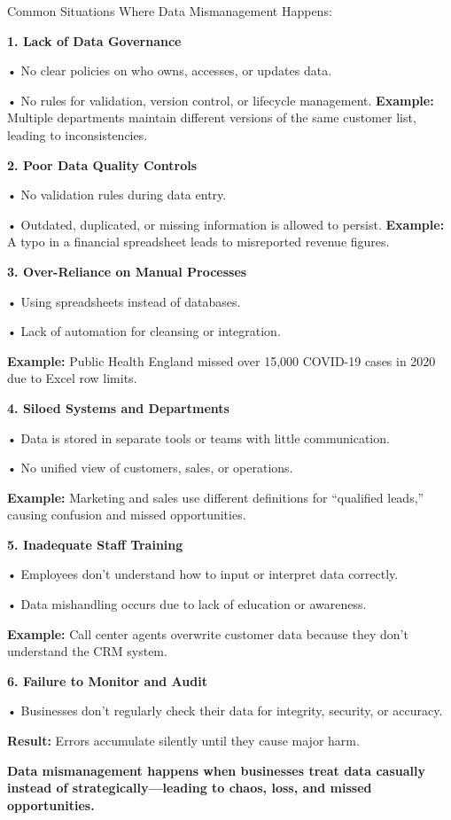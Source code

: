 \documentclass[
  man,
  floatsintext,
  longtable,
  nolmodern,
  notxfonts,
  notimes,
  colorlinks=true,linkcolor=blue,citecolor=blue,urlcolor=blue]{apa7}
\begin{document}
Common Situations Where Data Mismanagement Happens:

\textbf{1. Lack of Data Governance}

• No clear policies on who owns, accesses, or updates data.

• No rules for validation, version control, or lifecycle management.
\textbf{Example:} Multiple departments maintain different versions of
the same customer list, leading to inconsistencies.

\textbf{2. Poor Data Quality Controls}

• No validation rules during data entry.

• Outdated, duplicated, or missing information is allowed to persist.
\textbf{Example:} A typo in a financial spreadsheet leads to misreported
revenue figures.

\textbf{3. Over-Reliance on Manual Processes}

• Using spreadsheets instead of databases.

• Lack of automation for cleansing or integration.

\textbf{Example:} Public Health England missed over 15,000 COVID-19
cases in 2020 due to Excel row limits.

\textbf{4. Siloed Systems and Departments}

• Data is stored in separate tools or teams with little communication.

• No unified view of customers, sales, or operations.

\textbf{Example:} Marketing and sales use different definitions for
``qualified leads,'' causing confusion and missed opportunities.

\textbf{5. Inadequate Staff Training}

• Employees don't understand how to input or interpret data correctly.

• Data mishandling occurs due to lack of education or awareness.

\textbf{Example:} Call center agents overwrite customer data because
they don't understand the CRM system.

\textbf{6. Failure to Monitor and Audit}

• Businesses don't regularly check their data for integrity, security,
or accuracy.

\textbf{Result:} Errors accumulate silently until they cause major harm.

\textbf{Data mismanagement happens when businesses treat data casually
instead of strategically---leading to chaos, loss, and missed
opportunities.}
\end{document}
